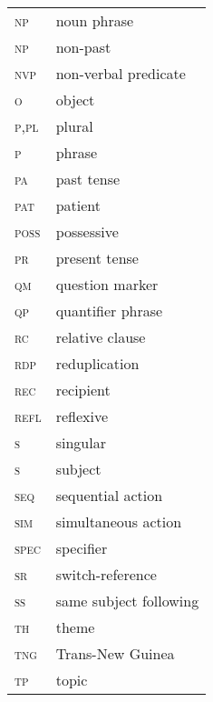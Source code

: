 \begin{tabular}{ll}
\textsc{np}                            & noun phrase \\
\textsc{np}                            & non-past \\
\textsc{nvp}                            & non-verbal predicate \\
\textsc{o}                            & object \\
\textsc{p,pl}                            &  plural \\
\textsc{p}                            & phrase \\
\textsc{pa}                            & past tense \\
\textsc{pat}                            & patient \\
\textsc{poss}                            & possessive \\
\textsc{pr}                            & present tense \\
\textsc{qm}                            & question marker \\
\textsc{qp}                            & quantifier phrase \\
\textsc{rc}                            & relative clause \\
\textsc{rdp}                            & reduplication \\
\textsc{rec}                            & recipient \\
\textsc{refl}                            & reflexive \\
\textsc{s}                            & singular \\
\textsc{s}                            & subject \\
\textsc{seq}                            & sequential action \\
\textsc{sim}                            & simultaneous action \\
\textsc{spec}                            & specifier \\
\textsc{sr}                            & switch-reference \\
\textsc{ss}                            & same subject following \\
\textsc{th}                            & theme \\
\textsc{tng}                            & Trans-New Guinea \\
\textsc{tp}                            & topic \\
\end{tabular}

